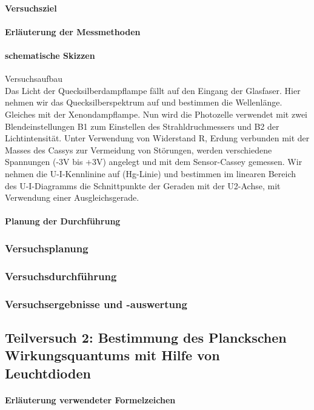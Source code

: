 \documentclass[12pt,oneside,oldfontcommands]{memoir}
\begin{document}
\paragraph{Versuchsziel}



\paragraph{Erläuterung der Messmethoden}
\paragraph{schematische Skizzen}
Versuchsaufbau\\
Das Licht der Quecksilberdampflampe fällt auf den Eingang der Glasfaser. Hier nehmen wir das Quecksilberspektrum auf und bestimmen die Wellenlänge. Gleiches mit der Xenondampflampe.
Nun wird die Photozelle verwendet mit zwei Blendeinstellungen B1 zum Einstellen des Strahldruchmessers und B2 der Lichtintensität. Unter Verwendung von Widerstand R, Erdung verbunden mit der Masses des Cassys zur Vermeidung von Störungen, werden verschiedene Spannungen (-3V bis +3V) angelegt und mit dem Sensor-Cassey gemessen.
Wir nehmen die U-I-Kennlinine auf (Hg-Linie) und bestimmen im linearen Bereich des U-I-Diagramms die Schnittpunkte der Geraden mit der U2-Achse, mit Verwendung einer Ausgleichsgerade.

\paragraph{Planung der Durchführung}
\subsubsection{Versuchsplanung}
\subsubsection{Versuchsdurchführung}
\subsubsection{Versuchsergebnisse und -auswertung}


\subsection{Teilversuch 2: Bestimmung des Planckschen Wirkungsquantums mit Hilfe von Leuchtdioden}
\paragraph{Erläuterung verwendeter Formelzeichen}
\end{document}
